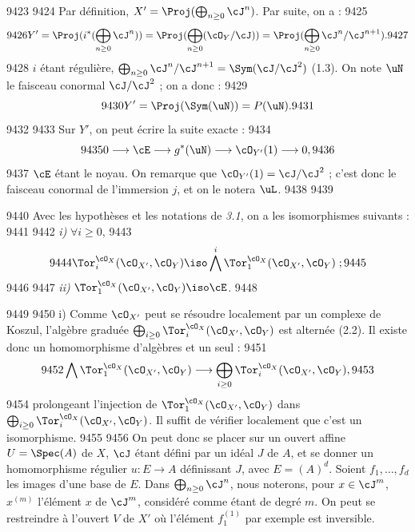   9423	
  9424	Par d\'efinition, $X' = \Proj(\bigoplus_{n \geq 0} \cJ^n)$. Par suite, on a :
  9425	\[
  9426	Y' = \Proj(i^{*}(\bigoplus_{n \geq 0} \cJ^n)) = \Proj(\bigoplus_{n \geq 0} (\cO_Y/\cJ)) = \Proj(\bigoplus_{n \geq 0} \cJ^n/\cJ^{n+1}).
  9427	\]
  9428	$i$ \'etant r\'eguli\`ere, $\bigoplus_{n \geq 0} \cJ^n/\cJ^{n+1} = \Sym(\cJ/\cJ^2)$ (1.3). On note $\uN$ le faisceau conormal $\cJ/\cJ^2$ ; on a donc :
  9429	\[
  9430	Y' = \Proj(\Sym(\uN)) = P(\uN).
  9431	\]
  9432	
  9433	Sur $Y'$, on peut \'ecrire la suite exacte :
  9434	\begin{equation}\label{eq:3.1.2}
  9435	0 \longrightarrow \cE \longrightarrow g^{*}(\uN) \longrightarrow \cO_{Y'}(1) \longrightarrow 0,
  9436	\end{equation}
  9437	$\cE$ \'etant le noyau. On remarque que $\cO_{Y'}(1) = \cJ/\cJ^2$ ; c'est donc le faisceau conormal de l'immersion $j$, et on le notera $\uL$.
  9438	
  9439	\begin{lemme}[3.2]
  9440	Avec les hypoth\`eses et les notations de \emph{3.1}, on a les isomorphismes suivants :
  9441	
  9442	\emph{i)} $\forall i \geq 0$,
  9443	\[
  9444	\Tor_i^{\cO_X}(\cO_{X'}, \cO_Y) \iso \bigwedge^i \Tor_1^{\cO_X}(\cO_{X'}, \cO_Y) \; ;
  9445	\]
  9446	
  9447	\emph{ii)} $\Tor_1^{\cO_X}(\cO_{X'}, \cO_Y) \iso \cE$.
  9448	\end{lemme}
  9449	
  9450	i) Comme $\cO_{X'}$ peut se r\'esoudre localement par un complexe de Koszul, l'alg\`ebre gradu\'ee $\bigoplus_{i \geq 0} \Tor_i^{\cO_X}(\cO_{X'}, \cO_Y)$ est altern\'ee (2.2). Il existe donc un homomorphisme d'alg\`ebres et un seul :
  9451	\begin{equation}\label{eq:3.2.1}
  9452	\bigwedge \Tor_1^{\cO_X}(\cO_{X'}, \cO_Y) \longrightarrow \bigoplus_{i \geq 0} \Tor_i^{\cO_X}(\cO_{X'}, \cO_Y),
  9453	\end{equation}
  9454	prolongeant l'injection de $\Tor_1^{\cO_X}(\cO_{X'}, \cO_Y)$ dans $\bigoplus_{i \geq 0} \Tor_i^{\cO_X}(\cO_{X'}, \cO_Y)$. Il suffit de v\'erifier localement que c'est un isomorphisme.
  9455	
  9456	On peut donc se placer sur un ouvert affine $U = \Spec(A)$ de $X$, $\cJ$ \'etant d\'efini par un id\'eal $J$ de $A$, et se donner un homomorphisme r\'egulier $u: E \to A$ d\'efinissant $J$, avec $E = (A)^d$. Soient $f_1,\dots,f_d$ les images d'une base de $E$. Dans $\bigoplus_{n \geq 0} \cJ^n$, nous noterons, pour $x \in \cJ^m$, $x^{(m)}$ l'\'el\'ement $x$ de $\cJ^m$, consid\'er\'e comme \'etant de degr\'e $m$. On peut se restreindre \`a l'ouvert $V$ de $X'$ o\`u l'\'el\'ement $f_1^{(1)}$ par exemple est inversible.
